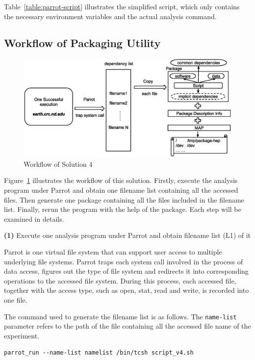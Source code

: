 \documentclass{sig-alternate}
\begin{document}
Table~\ref{table:parrot-script} illustrates
the simplified script, which
only contains the necessary environment variables and the
actual analysis command.

\subsection{Workflow of Packaging Utility}
\begin{figure}
\centering
\includegraphics[width=1.6\columnwidth]{workflow-parrot.eps}
\caption{Workflow of Solution 4}
\label{fig:workflow-parrot}
\end{figure}

Figure~\ref{fig:workflow-parrot} illustrates the workflow of this solution. Firstly, execute the analysis program under Parrot and obtain one filename list containing all the accessed files. Then generate one package containing all the files included in the filename list. Finally, rerun the program with the help of the package. Each step will be examined in details.

{\bf(1)} Execute one analysis program under Parrot and obtain filename list (L1) of it

Parrot is one virtual file system that can support user access to multiple
underlying file systems. Parrot traps each system call involved in the process
of data access, figures out the type of file system and redirects it into
corresponding operations to the accessed file system. During this process, each
accessed file, together with the access type, such as
open, stat, read and write, is recorded into one file.

The command used to generate the filename list is as follows. The {\tt name-list} parameter refers to the path of the file containing all the accessed file name of the experiment.

{\tt parrot\_run \texttt{-{}-}name-list namelist /bin/tcsh script\_v4.sh}
\end{document}
